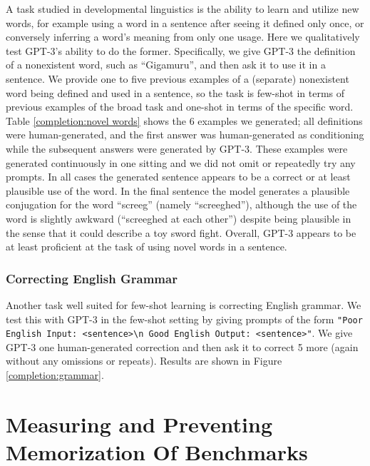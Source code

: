 A task studied in developmental linguistics \cite{carey1978acquiring} is the ability to learn and utilize new words, for example using a word in a sentence after seeing it defined only once, or conversely inferring a word’s meaning from only one usage.  Here we qualitatively test GPT-3’s ability to do the former.  Specifically, we give GPT-3 the definition of a nonexistent word, such as ``Gigamuru'', and then ask it to use it in a sentence.  We provide one to five previous examples of a (separate) nonexistent word being defined and used in a sentence, so the task is few-shot in terms of previous examples of the broad task and one-shot in terms of the specific word.  Table \ref{completion:novel words} shows the 6 examples we generated; all definitions were human-generated, and the first answer was human-generated as conditioning while the subsequent answers were generated by GPT-3.  These examples were generated continuously in one sitting and we did not omit or repeatedly try any prompts.  In all cases the generated sentence appears to be a correct or at least plausible use of the word.  In the final sentence the model generates a plausible conjugation for the word ``screeg'' (namely ``screeghed''), although the use of the word is slightly awkward (``screeghed at each other'') despite being plausible in the sense that it could describe a toy sword fight.  Overall, GPT-3 appears to be at least proficient at the task of using novel words in a sentence.

        \subsubsection{Correcting English Grammar}
        \label{section:Correcting_English_Grammar}

Another task well suited for few-shot learning is correcting English grammar.  We test this with GPT-3 in the few-shot setting by giving prompts of the form \texttt{"Poor English Input: <sentence>{\textbackslash}n Good English Output: <sentence>"}.  We give GPT-3 one human-generated correction and then ask it to correct 5 more (again without any omissions or repeats).  Results are shown in Figure \ref{completion:grammar}.

\section{Measuring and Preventing Memorization Of Benchmarks}

\label{section:measuring_and_preventing_memorization_of_benchmarks}

